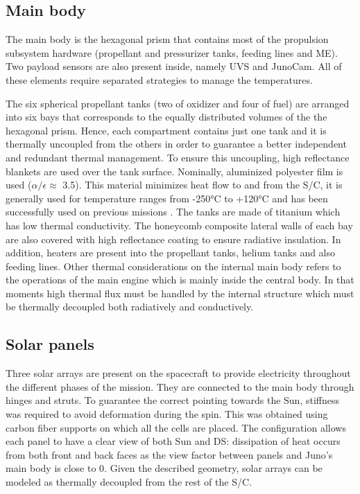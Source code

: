     \subsection{Main body}
    \label{subsec:main_body}
    The main body is the hexagonal prism that contains most of the propulsion subsystem hardware (propellant and pressurizer tanks, feeding lines and ME). Two payload sensors are also present inside, namely UVS and JunoCam. All of these elements require separated strategies to manage the temperatures. 
    
    The six spherical propellant tanks (two of oxidizer and four of fuel) are arranged into six bays that corresponds to the equally distributed volumes of the the hexagonal prism. Hence, each compartment contains just one tank and it is thermally uncoupled from the others in order to guarantee a better independent and redundant thermal management. To ensure this uncoupling, high reflectance blankets are used over the tank surface. Nominally, aluminized polyester film is used ($\alpha / \epsilon \approx$ 3.5). This material minimizes heat flow to and from the S/C, it is generally used for temperature ranges from -250°C to +120°C and has been successfully used on previous missions \cite{alum_poly}. The tanks are made of titanium which has low thermal conductivity. 
    The honeycomb composite lateral walls of each bay are also covered with high reflectance coating to ensure radiative insulation.
    In addition, heaters are present into the propellant tanks, helium tanks and also feeding lines. \cite{LL_early_cruise}
    Other thermal considerations on the internal main body refers to the  operations of the main engine which is mainly inside the central body. In that moments high thermal flux must be handled by the internal structure which must be thermally decoupled both radiatively and conductively. %


    \subsection{Solar panels}
    \label{subsec:solar_panels}
    Three solar arrays are present on the spacecraft to provide electricity throughout the different phases of the mission. They are connected to the main body through hinges and struts. To guarantee the correct pointing towards the Sun, stiffness was required to avoid deformation during the spin. This was obtained using carbon fiber supports on which all the cells are placed. The configuration allows each panel to have a clear view of both Sun and DS: dissipation of heat occurs from both front and back faces as the view factor between panels and Juno's main body is close to 0. Given the described geometry, solar arrays can be modeled as thermally decoupled from the rest of the S/C.
     
